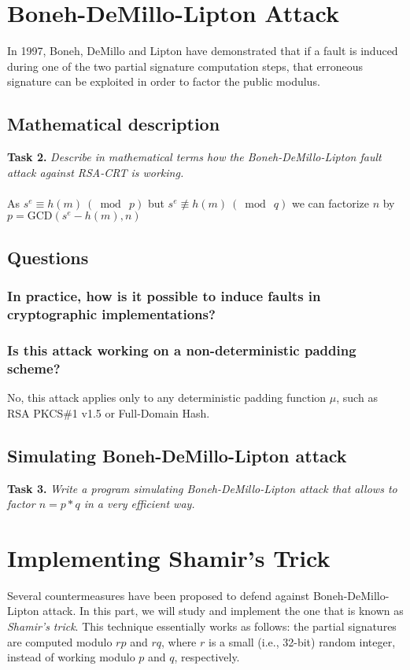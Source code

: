 \documentclass[a4paper]{report}
\begin{document}
\chapter{Boneh-DeMillo-Lipton Attack}
In 1997, Boneh, DeMillo and Lipton have demonstrated that if a fault is induced during one of the two partial signature computation steps, that erroneous signature can be exploited in order to factor the public modulus.

\section{Mathematical description}
\textbf{Task 2.} \textit{Describe in mathematical terms how the Boneh-DeMillo-Lipton fault attack against RSA-CRT is working.}
\\ \\
As $s^e \equiv h(m)\ (\bmod\ p)$ but $s^e \not\equiv h(m)\ (\bmod\ q)$ we can factorize $n$ by \\ $p = \textrm{GCD}(s^e - h(m), n)$

\section{Questions}
\subsection{In practice, how is it possible to induce faults in cryptographic implementations?}


\subsection{Is this attack working on a non-deterministic padding scheme?}
No, this attack applies only to any deterministic padding function $\mu$, such as RSA PKCS\#1 v1.5 or Full-Domain Hash.

\section{Simulating Boneh-DeMillo-Lipton attack}
\textbf{Task 3.} \textit{Write a program simulating Boneh-DeMillo-Lipton attack that allows to factor $n = p*q$ in a very efficient way.}


\chapter{Implementing Shamir’s Trick}
Several countermeasures have been proposed to defend against Boneh-DeMillo-Lipton attack. In this part, we will study and implement the one that is known as \textit{Shamir’s trick}. This technique essentially works as follows: the partial signatures are computed modulo $rp$ and $rq$, where $r$ is a small (i.e., 32-bit) random integer, instead of working modulo $p$ and $q$, respectively.
\end{document}
